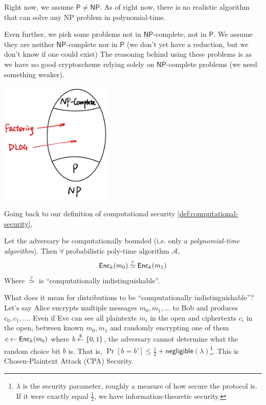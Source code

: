 Right now, we assume $\mathsf{P}\neq\mathsf{NP}$. As of right now, there is no realistic algorithm that can solve any \textsf{NP} problem in polynomial-time.

Even further, we pick some problems not in $\mathsf{NP}$-complete, not in $\mathsf{P}$. We assume they are neither $\mathsf{NP}$-complete nor in $\mathsf{P}$ (we don't yet have a reduction, but we don't know if one could exist) The reasoning behind using these problems is as we have no good cryptoscheme relying solely on $\mathsf{NP}$-complete problems (we need something weaker).

\begin{center}
    \includegraphics[width=0.4\textwidth]{images/2023-01-31/pnp-venn.png}
\end{center}

Going back to our definition of computational security \cref{def:computational-security},
\begin{definition*}
    Let the adversary be computationally bounded (i.e. only a \emph{polynomial-time algorithm}). Then $\forall\ \text{probabilistic poly-time algorithm }\mathcal{A}$,
    \[\operatorname{\mathsf{Enc}}_k(m_0)\overset{c}{\simeq}\operatorname{\mathsf{Enc}}_k(m_1)\]
    Where $\overset{c}{\simeq}$ is ``computationally indistinguishable''.
\end{definition*}

What does it mean for distributions to be ``computationally indistinguishable''? Let's say Alice encrypts multiple messages $m_0, m_1, \dots$ to Bob and produces $c_0, c_1, \dots$. Even if Eve can see all plaintexts $m_i$ in the open and ciphertexts $c_i$ in the open, between known $m_0, m_1$ and randomly encrypting one of them $c\leftarrow \operatorname{\mathsf{Enc}}_{k}(m_b)$ where $b\overset{\$}{\leftarrow} \{0, 1\}$, the adversary cannot determine what the random choice bit $b$ is. That is, $\Pr[b = b'] \leq \frac{1}{2} + \mathsf{negligible}(\lambda)$\footnote{$\lambda$ is the security parameter, roughly a measure of how secure the protocol is. If it were exactly equal $\frac{1}{2}$, we have information-theoretic security.}. This is Chosen-Plaintext Attack (CPA) Security.


